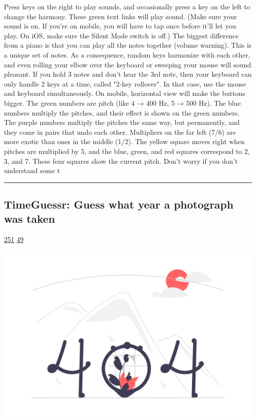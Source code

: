 \documentclass[10pt,a4paper]{article}
\begin{document}
\begin{multicols*}{2}
Press keys on the right to play sounds, and occasionally press a key on the left to change the harmony. These green text links will play sound. (Make sure your sound is on. If you're on mobile, you will have to tap once before it'll let you play. On iOS, make sure the Silent Mode switch is off.)
The biggest difference from a piano is that you can play all the notes together (volume warning). This is a unique set of notes. As a consequence, random keys harmonize with each other, and even rolling your elbow over the keyboard or sweeping your mouse will sound pleasant. If you hold 3 notes and don't hear the 3rd note, then your keyboard can only handle 2 keys at a time, called "2-key rollover". In that case, use the mouse and keyboard simultaneously. On mobile, horizontal view will make the buttons bigger.
The green numbers are pitch (like 4 → 400 Hz, 5 → 500 Hz). The blue numbers multiply the pitches, and their effect is shown on the green numbers. The purple numbers multiply the pitches the same way, but permanently, and they come in pairs that undo each other. Multipliers on the far left (7/6) are more exotic than ones in the middle (1/2). The yellow square moves right when pitches are multiplied by 5, and the blue, green, and red squares correspond to 2, 3, and 7. These four squares show the current pitch.
Don't worry if you don't understand some t
\par\noindent\textcolor{red}{\rule{\linewidth}{0.2mm}}
\vfill
\null
\noindent\begin{minipage}{\linewidth}
\subsection{TimeGuessr: Guess what year a photograph was taken}
\textsc{\footnotesize
{\scriptsize\faThumbsOUp}\space 
\href{http://news.ycombinator.com/item?id=37203511\&utm\_term=comment}{251} 
{\scriptsize\faComments}\space 
\href{http://news.ycombinator.com/item?id=37203511\&utm\_term=comment}{49} 
}
\par\medskip\noindent
\href{https://timeguessr.com/?utm\_source=hackernewsletter\&utm\_medium=email\&utm\_term=fun}{
    \includegraphics[width=0.99\linewidth]{notfound.png}
}
\end{minipage}

\end{multicols*}
\end{document}

